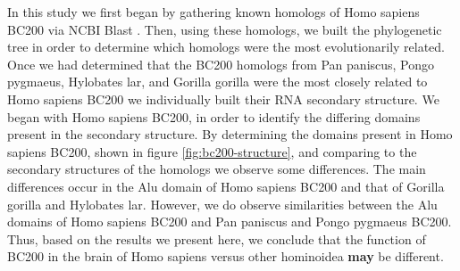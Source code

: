 \documentclass[conference, 11pt]{IEEEtran}
\begin{document}
In this study we first began by gathering known homologs of Homo sapiens BC200 via NCBI Blast \cite{blastTool,madden2012blast}. 
Then, using these homologs, we built the phylogenetic tree in order to determine which homologs were the most evolutionarily related. 
Once we had determined that the BC200 homologs from Pan paniscus, Pongo pygmaeus, Hylobates lar, and Gorilla gorilla were the most closely related to Homo sapiens BC200 we individually built their RNA secondary structure. 
We began with Homo sapiens BC200, in order to identify the differing domains present in the secondary structure. 
By determining the domains present in Homo sapiens BC200, shown in figure \ref{fig:bc200-structure}, and comparing to the secondary structures of the homologs we observe some differences. 
The main differences occur in the Alu domain of Homo sapiens BC200 and that of Gorilla gorilla and Hylobates lar. However, we do observe similarities between the Alu domains of Homo sapiens BC200 and Pan paniscus and Pongo pygmaeus BC200. 
Thus, based on the results we present here, we conclude that the function of BC200 in the brain of Homo sapiens versus other hominoidea \textbf{may} be different. 

\end{document}
